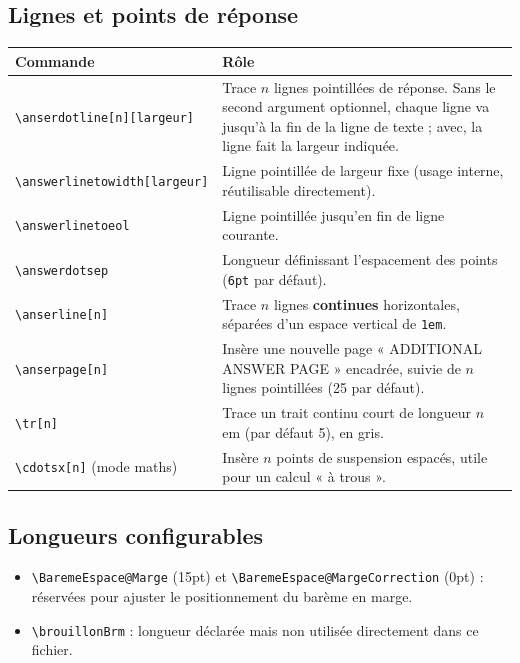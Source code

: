 \documentclass[11pt,a4paper]{article}
\newcommand{\cmdname}[1]{\texttt{\textbackslash#1}}
\begin{document}
\subsection{Lignes et points de réponse}

\begin{longtable}{@{}p{4cm}p{10.5cm}@{}}
\toprule
\textbf{Commande} & \textbf{Rôle} \\
\midrule
\endhead
\cmdname{anserdotline[n][largeur]} & Trace $n$ lignes pointillées de réponse. Sans le second argument optionnel, chaque ligne va jusqu'à la fin de la ligne de texte ; avec, la ligne fait la largeur indiquée. \\[4pt]
\cmdname{answerlinetowidth[largeur]} & Ligne pointillée de largeur fixe (usage interne, réutilisable directement). \\[4pt]
\cmdname{answerlinetoeol} & Ligne pointillée jusqu'en fin de ligne courante. \\[4pt]
\cmdname{answerdotsep} & Longueur définissant l'espacement des points (\texttt{6pt} par défaut). \\[4pt]
\cmdname{anserline[n]} & Trace $n$ lignes \textbf{continues} horizontales, séparées d'un espace vertical de \texttt{1em}. \\[4pt]
\cmdname{anserpage[n]} & Insère une nouvelle page « ADDITIONAL ANSWER PAGE » encadrée, suivie de $n$ lignes pointillées (25 par défaut). \\[4pt]
\cmdname{tr[n]} & Trace un trait continu court de longueur $n$ em (par défaut 5), en gris. \\[4pt]
\cmdname{cdotsx[n]} (mode maths) & Insère $n$ points de suspension espacés, utile pour un calcul « à trous ». \\
\bottomrule
\end{longtable}

\subsection{Longueurs configurables}

\begin{itemize}
  \item \texttt{\textbackslash BaremeEspace@Marge} (15pt) et \texttt{\textbackslash BaremeEspace@MargeCorrection} (0pt) : réservées pour ajuster le positionnement du barème en marge.
  \item \texttt{\textbackslash brouillonBrm} : longueur déclarée mais non utilisée directement dans ce fichier.
\end{itemize}
\end{document}
